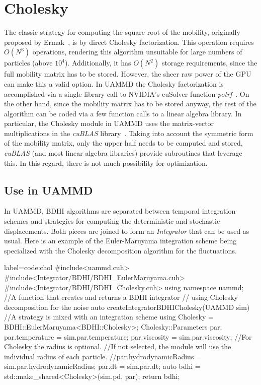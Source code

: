 \documentclass[twoside,openright,titlepage,numbers=noenddot,%
headinclude,footinclude,cleardoublepage=empty,abstract=on,
BCOR=5mm,fontsize=11pt, dvipsnames, paper=b5
]{scrreprt}
\newcommand{\uammd}{\gls{UAMMD}\xspace}
\newcommand{\gpu}{\gls{GPU}\xspace}
\begin{document}
\section{Cholesky}\label{sec:chol}
The classic strategy for computing the square root of the mobility, originally proposed by Ermak~\cite{Ermak1978}, is by direct Cholesky factorization. This operation requires $O(N^3)$ operations, rendering this algorithm unsuitable for large numbers of particles (above $10^4$). Additionally, it has $O(N^2)$ storage requirements, since the full mobility matrix has to be stored.
However, the sheer raw power of the \gpu can make this a valid option. In \uammd the Cholesky factorization is accomplished via a single library call to NVIDIA's cuSolver function \emph{potrf}~\cite{cusolver}.
On the other hand, since the mobility matrix has to be stored anyway, the rest of the algorithm can be coded via a few function calls to a linear algebra library. In particular, the Cholesky module in \uammd uses the matrix-vector multiplications in the \emph{cuBLAS} library~\cite{cublas}. Taking into account the symmetric form of the mobility matrix, only the upper half needs to be computed and stored, \emph{cuBLAS} (and most linear algebra libraries) provide subroutines that leverage this. In this regard, there is not much possibility for optimization.

\subsection*{Use in UAMMD}\label{sec:uammdchol}
In \uammd, \gls{BDHI} algorithms are separated between temporal integration schemes and strategies for computing the deterministic and stochastic displacements. Both pieces are joined to form an \emph{Integrator} that can be used as usual.
Here is an example of the Euler-Maruyama integration scheme being specialized with the Cholesky decomposition algorithm for the fluctuations.
\begin{code2}{label=code:chol}
#include<uammd.cuh>
#include<Integrator/BDHI/BDHI_EulerMaruyama.cuh>
#include<Integrator/BDHI/BDHI_Cholesky.cuh>
using namespace uammd;
//A function that creates and returns a BDHI integrator
// using Cholesky decomposition for the noise
auto createIntegratorBDHICholesky(UAMMD sim){   
  //A strategy is mixed with an integration scheme
  using Cholesky = BDHI::EulerMaruyama<BDHI::Cholesky>;
  Cholesky::Parameters par;
  par.temperature = sim.par.temperature;
  par.viscosity = sim.par.viscosity;
  //For Cholesky the radius is optional.
  //If not selected, the module will use the individual radius of each particle.
  //par.hydrodynamicRadius = sim.par.hydrodynamicRadius;
  par.dt = sim.par.dt;
  auto bdhi = std::make_shared<Cholesky>(sim.pd, par);
  return bdhi;
}
\end{code2}
\end{document}
